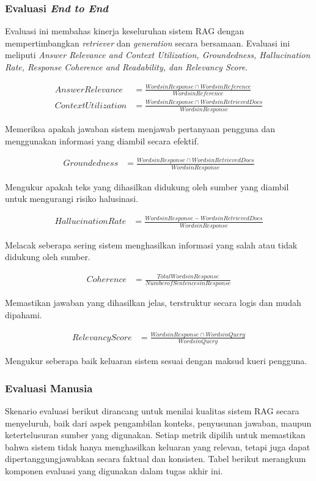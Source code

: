 \subsubsection{Evaluasi \textit{End to End}}
Evaluasi ini membahas kinerja keseluruhan sistem RAG dengan mempertimbangkan \textit{retriever} dan \textit{generation} secara bersamaan.
Evaluasi ini meliputi \textit{Answer Relevance and Context Utilization, Groundedness, Hallucination Rate, Response Coherence and Readability, dan Relevancy Score}.

\begin{align}
Answer Relevance &= \frac{Words in Response∩Words in Reference}{Words in Reference}\\
Context Utilization &= \frac{Words in Response∩Words in Retrieved Docs}{Words in Response}
\end{align}

Memeriksa apakah jawaban sistem menjawab pertanyaan pengguna dan menggunakan informasi yang diambil secara efektif.

\begin{align}
Groundedness &= \frac{Words in Response∩Words in Retrieved Docs}{Words in Response}
\end{align}

Mengukur apakah teks yang dihasilkan didukung oleh sumber yang diambil untuk mengurangi risiko halusinasi.

\begin{align}
Hallucination Rate &= \frac{Words in Response−Words in Retrieved Docs}{Words in Response}
\end{align}

Melacak seberapa sering sistem menghasilkan informasi yang salah atau tidak didukung oleh sumber.

\begin{align}
Coherence &= \frac{Total Words in Response}{Number of Sentences in Response}
\end{align}

Memastikan jawaban yang dihasilkan jelas, terstruktur secara logis dan mudah dipahami.

\begin{align}
Relevancy Score &= \frac{Words in Response∩Words in Query}{Words in Query}
\end{align}

Mengukur seberapa baik keluaran sistem sesuai dengan maksud kueri pengguna.

\subsubsection{Evaluasi Manusia}
Skenario evaluasi berikut dirancang untuk menilai kualitas sistem RAG secara menyeluruh, baik dari aspek pengambilan konteks, penyusunan jawaban, maupun ketertelusuran sumber yang digunakan. Setiap metrik dipilih untuk memastikan bahwa sistem tidak hanya menghasilkan keluaran yang relevan, tetapi juga dapat dipertanggungjawabkan secara faktual dan konsisten. Tabel berikut merangkum komponen evaluasi yang digunakan dalam tugas akhir ini.

